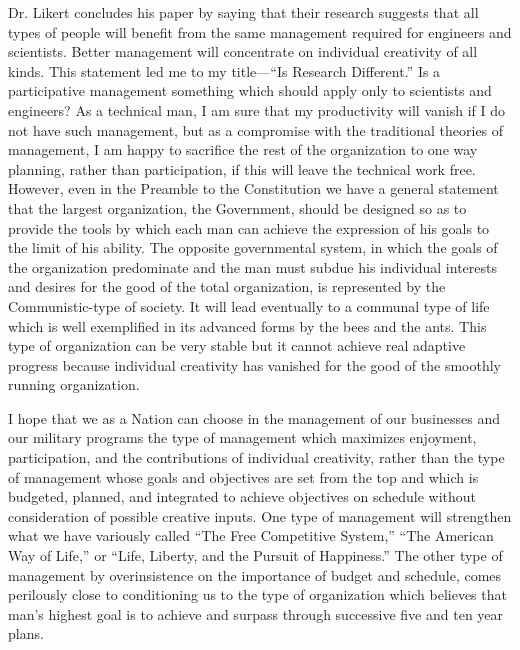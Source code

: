 \documentclass[twocolumn]{memoir}
\begin{document}
Dr. Likert concludes his paper by saying that their research suggests that all types of people will benefit from the same management required for engineers and scientists. Better management will concentrate on individual creativity of all kinds. This statement led me to my title---``Is Research Different.'' Is a participative management something which should apply only to scientists and engineers? As a technical man, I am sure that my productivity will vanish if I do not have such management, but as a compromise with the traditional theories of management, I am happy to sacrifice the rest of the organization to one way planning, rather than participation, if this will leave the technical work free. However, even in the Preamble to the Constitution we have a general statement that the largest organization, the Government, should be designed so as to provide the tools by which each man can achieve the expression of his goals to the limit of his ability. The opposite governmental system, in which the goals of the organization predominate and the man must subdue his individual interests and desires for the good of the total organization, is represented by the Communistic-type of society. It will lead eventually to a communal type of life which is well exemplified in its advanced forms by the bees and the ants. This type of organization can be very stable but it cannot achieve real adaptive progress because individual creativity has vanished for the good of the smoothly running organization.

I hope that we as a Nation can choose in the management of our businesses and our military programs the type of management which maximizes enjoyment, participation, and the contributions of individual creativity, rather than the type of management whose goals and objectives are set from the top and which is budgeted, planned, and integrated to achieve objectives on schedule without consideration of possible creative inputs. One type of management will strengthen what we have variously called ``The Free Competitive System,'' ``The American Way of Life,'' or ``Life, Liberty, and the Pursuit of Happiness.'' The other type of management by overinsistence on the importance of budget and schedule, comes perilously close to conditioning us to the type of organization which believes that man's highest goal is to achieve and surpass through successive five and ten year plans.

\printbibliography
\end{document}
